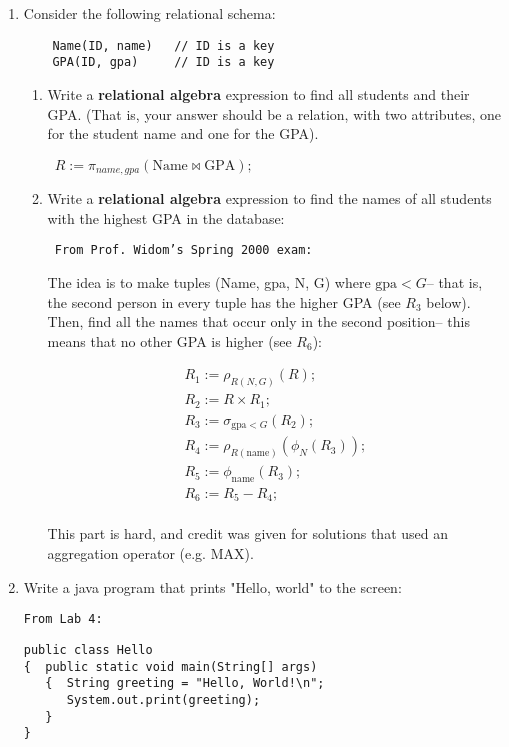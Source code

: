 {\begin{enumerate}
\item Consider the following relational schema:
\begin{verbatim}
    Name(ID, name)   // ID is a key
    GPA(ID, gpa)     // ID is a key
\end{verbatim}
\begin{enumerate}
    \item Write a {\bf relational algebra} expression to find all 
	students and their GPA.  (That is, your answer should be
	a relation, with two attributes, one for the student name
	and one for the GPA).

{\tt
$R := \pi_{name,gpa}(\mbox{Name} \bowtie \mbox{GPA});$

}

    \item Write a {\bf relational algebra} expression to find the 
	names of all students with the highest GPA in the database:

{\tt
From Prof. Widom's Spring 2000 exam:

The idea is to make tuples (Name, gpa, N, G) where $\mbox{gpa} < G$--
that is, the second person in every tuple has the higher GPA (see $R_3$
below).  Then,
find all the names that occur only in the second position-- this means that
no other GPA is higher (see $R_6$):  

$$
\begin{array}{l}
R_1 := \rho_{R(N,G)}(R);\\
R_2 := R \times R_1;\\
R_3 := \sigma_{\mbox{gpa} < G}(R_2);\\
R_4 := \rho_{R(\mbox{name})}(\phi_N(R_3));\\
R_5 := \phi_{\mbox{name}}(R_3);\\
R_6 := R_5 - R_4;\\
\end{array}
$$

This part is hard, and credit was given for solutions that used 
an aggregation operator (e.g. MAX).

}
\end{enumerate}

\item Write a java program that prints "Hello, world" to the screen:

{\tt From Lab 4:

\begin{verbatim}
public class Hello
{  public static void main(String[] args)
   {  String greeting = "Hello, World!\n";
      System.out.print(greeting);
   }
}
\end{verbatim}

}
\end{enumerate}}
